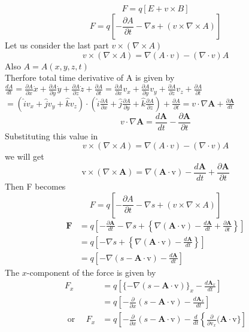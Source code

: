 $$F=q\left[ E+v\times B\right] $$
$$F=q\left[ -\frac{\partial A}{\partial t}-\nabla s+(v\times \nabla \times A)\right] $$
Let us consider the last part $v\times(\nabla \times A)$\\
$$v\times(\nabla \times A)=\nabla (A\cdot v)-(\nabla \cdot v)A$$
Also $A=A(x,y,z,t)$\\
Therfore total time derivative of A is given by\\
$\frac{dA}{dt}=\frac{\partial A}{\partial x} \dot{x}+\frac{\partial A}{\partial y} \dot{y}+\frac{\partial A}{\partial z} \dot{z}+\frac{\partial A}{\partial t}=\frac{\partial A}{\partial x} v_x+\frac{\partial A}{\partial y} v_y+\frac{\partial A}{\partial z} v_z+\frac{\partial A}{\partial t}$\\
$=(\hat{i}v_x+\hat{j}v_y+\hat{k}v_z)\cdot \left( \hat{i}\frac{\partial A}{\partial x}+\hat{j}\frac{\partial A}{\partial y}+\hat{k}\frac{\partial A}{\partial z}\right) +\frac{\partial A}{\partial t}=v \cdot \nabla \mathbf{A}+\frac{\partial \mathbf{A}}{d t}$ \\
	$$v \cdot\nabla \mathbf{A}=\frac{d \mathbf{A}}{d t}-\frac{\partial \mathbf{A}}{\partial t}$$
	Substituting this value in 
$$v\times(\nabla \times A)=\nabla (A\cdot v)-(\nabla \cdot v)A$$
we will get \\
$$\mathrm{v} \times(\nabla \times \mathbf{A})=\nabla(\mathbf{A} \cdot \mathrm{v})-\frac{d \mathbf{A}}{d t}+\frac{\partial \mathbf{A}}{\partial t}$$
Then F becomes\\
$$F=q\left[ -\frac{\partial A}{\partial t}-\nabla s+(v\times \nabla \times A)\right] $$
$$\begin{aligned}
	\mathbf{F} &=q\left[-\frac{\partial \mathbf{A}}{d t}-\nabla s+\left\{\nabla(\mathbf{A} \cdot \mathrm{v})-\frac{d \mathbf{A}}{d t}+\frac{\partial \mathbf{A}}{\partial t}\right\}\right] \\
	&=q\left[-\nabla s+\left\{\nabla(\mathbf{A} \cdot \mathrm{v})-\frac{d \mathbf{A}}{d t}\right\}\right] \\
	&=q\left[-\nabla(s-\mathbf{A} \cdot \mathrm{v})-\frac{d \mathbf{A}}{d t}\right]
\end{aligned}$$
The $x$-component of the force is given by
$$
\begin{aligned}
F_{x} &=q\left[\{-\nabla(s-\mathbf{A} \cdot \mathrm{v})\}_{x}-\frac{d \mathbf{A}_{x}}{d t}\right] \\
&=q\left[-\frac{\partial}{\partial x}(s-\mathbf{A} \cdot \mathrm{v})-\frac{d \mathbf{A}_{x}}{d t}\right] \\
\text { or } \quad F_{x} &=q\left[-\frac{\partial}{\partial x}(s-\mathbf{A} \cdot \mathrm{v})-\frac{d}{d t}\left\{\frac{\partial}{\partial \mathrm{v}_{x}}(\mathbf{A} \cdot \mathrm{v}\}\right]\right.
\end{aligned}
$$
